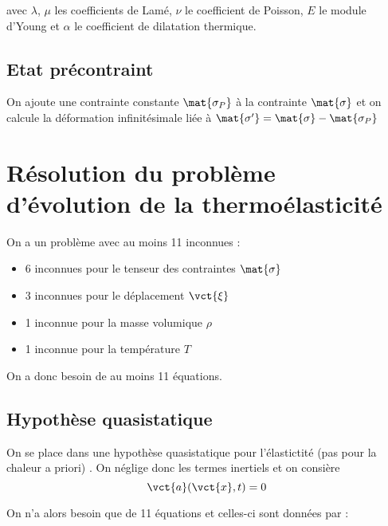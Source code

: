 \documentclass[11pt,a4paper]{article}
\begin{document}
avec $\lambda$, $\mu$ les coefficients de Lamé, $\nu$ le coefficient de Poisson, $E$ le module d'Young et $\alpha$ le coefficient de dilatation thermique.


\subsection{Etat précontraint}
On ajoute une contrainte constante $\mat{\sigma_P}$ à la contrainte $\mat{\sigma}$ et on calcule la déformation infinitésimale liée à $\mat{\sigma'}=\mat{\sigma}-\mat{\sigma_P}$


\section{Résolution du problème d'évolution de la thermoélasticité}
On a un problème avec au moins 11 inconnues :
\begin{itemize}
	\item 6 inconnues pour le tenseur des contraintes $\mat{\sigma}$
	\item 3 inconnues pour le déplacement $\vct{\xi}$
	\item 1 inconnue pour la masse volumique $\rho$
	\item 1 inconnue pour la température $T$
\end{itemize}

On a donc besoin de au moins 11  équations.

\subsection{Hypothèse quasistatique}
On se place dans une hypothèse quasistatique pour l'élastictité (pas pour la chaleur a priori) . On néglige donc les termes inertiels et on consière 
\begin{equation}
	\vct{a}(\vct{x},t)=0
\end{equation}

On n'a alors besoin que de 11 équations et celles-ci sont données par :
\end{document}
